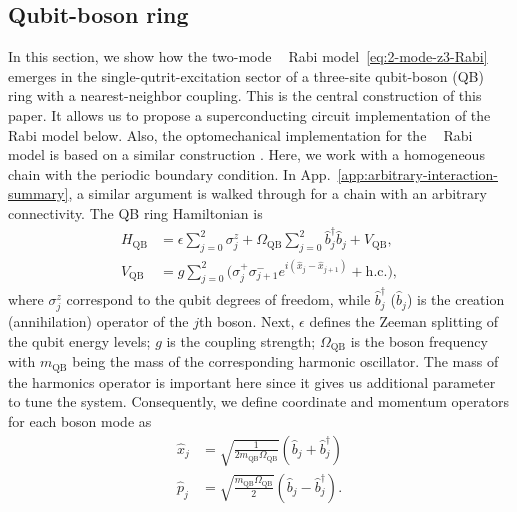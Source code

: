 \documentclass[reprint, aps, prx, amsmath, amssymb, longbibliography, superscriptaddress]{revtex4-2}
\DeclareMathOperator{\Zthree}{\mathbb{Z}_3}
\begin{document}
\subsection{Qubit-boson ring}
\label{sec:physical-implementation}

In this section, we show how the two-mode $\Zthree$ Rabi model~\eqref{eq:2-mode-z3-Rabi} emerges
in the single-qutrit-excitation sector of a three-site qubit-boson (QB) ring with a
nearest-neighbor coupling. This is the central construction of this paper. It allows us to propose a superconducting circuit implementation of the $\Zthree$ Rabi model below. Also, the optomechanical implementation for the $\Zthree$ Rabi model is based on a similar construction \cite{sedov_chiral_2020}.  Here, we work with a homogeneous chain with the periodic boundary condition. In App.~\ref{app:arbitrary-interaction-summary}, a similar argument is walked through for a chain with an arbitrary connectivity. The QB ring Hamiltonian is
\begin{equation}
\label{eq:physical-hamiltonian}
  \begin{aligned}
    H_{\text{QB}} &= \epsilon \sum_{j=0}^{2} \sigma_j^z
      + \Omega_{\text{QB}} \sum_{j=0}^{2} \hat b_j^{\dagger} \hat b_j
      + V_{\text{QB}},
      \\
    V_{\text{QB}} &= g \sum_{j=0}^{2}
      \bigl( \sigma_j^{+} \sigma_{j+1}^{-}
      e^{ i ( \hat x_j - \hat x_{j+1} ) } + \text{h.c.} \bigr),
  \end{aligned}
\end{equation}
where $\sigma_j^z$ correspond to the qubit degrees of freedom, while $\hat b_j^{\dagger}$ ($\hat b_j$) is the creation (annihilation) operator of the $j$th boson. Next, $\epsilon$ defines the Zeeman splitting of the qubit energy levels; $g$ is the coupling strength; $\Omega_{\text{QB}}$ is the boson frequency with $m_{\text{QB}}$ being the mass of the corresponding harmonic oscillator. The mass of the harmonics operator is important here since it gives us additional parameter to tune the system. Consequently, we define coordinate and momentum operators for each boson mode as
\begin{align}
    \hat x_j &= \sqrt{\frac{1}{2 m_{\text{QB}} \Omega_{\text{QB}}}}\left(\hat b_j + \hat b_j^{\dagger}\right) \\
    \hat p_j &= \sqrt{\frac{m_{\text{QB}} \Omega_{\text{QB}}}{2 }}\left(\hat b_j - \hat b_j^{\dagger}\right).
\end{align}

\end{document}
